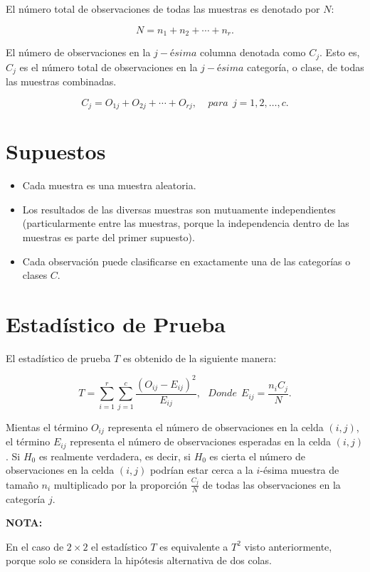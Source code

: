 \documentclass[
  a4paper,
  oneside,
  openany]{book}
\begin{document}
El número total de observaciones de todas las muestras es denotado por \(N\):

\[N=n_{1}+n_{2}+\cdots+n_{r}.\]

El número de observaciones en la \(j-ésima\) columna denotada como \(C_{j}\). Esto es, \(C_{j}\) es el número total de observaciones en la \(j-ésima\) categoría, o clase, de todas las muestras combinadas.

\[C_{j}=O_{1j}+O_{2j}+\cdots+O_{rj}, \ \ \ \ \ para\ \ j= 1,2,\ldots,c. \]

\hypertarget{supuestos-11}{%
\section{Supuestos}\label{supuestos-11}}

\begin{itemize}
\item
  Cada muestra es una muestra aleatoria.
\item
  Los resultados de las diversas muestras son mutuamente independientes (particularmente entre las muestras, porque la independencia dentro de las muestras es parte del primer supuesto).
\item
  Cada observación puede clasificarse en exactamente una de las categorías o clases \(C\).
\end{itemize}

\hypertarget{estaduxedstico-de-prueba-11}{%
\section{Estadístico de Prueba}\label{estaduxedstico-de-prueba-11}}

El estadístico de prueba \(T\) es obtenido de la siguiente manera:

\[T=\sum_{i=1}^{r}\sum_{j=1}^{c}\frac{(O_{ij}-E_{ij})^2}{E_{ij}}, \ \ \ Donde\ \ E_{ij}=\frac{n_{i}C_{j}}{N}.\]

Mientas el término \(O_{ij}\) representa el número de observaciones en la celda \((i,j)\), el término \(E_{ij}\) representa el número de observaciones esperadas en la celda \((i,j)\). Si \(H_0\) es realmente verdadera, es decir, si \(H_0\) es cierta el número de observaciones en la celda \((i,j)\) podrían estar cerca a la \(i\)-ésima muestra de tamaño \(n_{i}\) multiplicado por la proporción \(\frac{C_{j}}{N}\) de todas las observaciones en la categoría \(j\).

\textbf{NOTA:}

En el caso de \(2 \times 2\) el estadístico \(T\) es equivalente a \(T^2\) visto anteriormente, porque solo se considera la hipótesis alternativa de dos colas.
\end{document}
